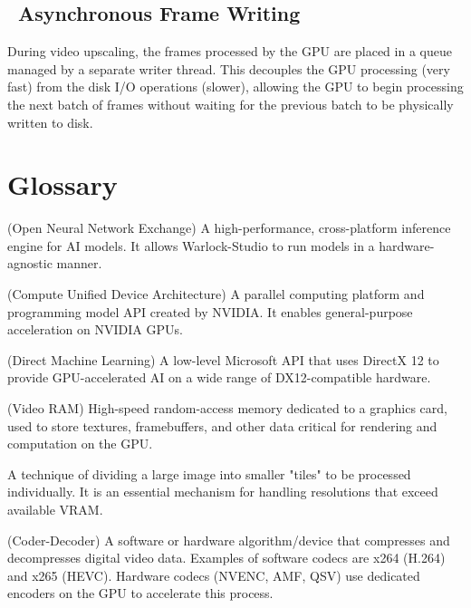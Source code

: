 \documentclass[11pt, a4paper]{article}
\newcommand{\SectionColor}{WarlockGray} %
\newcommand{\setsectioncolor}[1]{\renewcommand{\SectionColor}{#1}}
\begin{document}
\subsection{\faBolt\ Asynchronous Frame Writing}
During video upscaling, the frames processed by the GPU are placed in a queue managed by a separate writer thread. This decouples the GPU processing (very fast) from the disk I/O operations (slower), allowing the GPU to begin processing the next batch of frames without waiting for the previous batch to be physically written to disk.

\setsectioncolor{GlossaryColor}
\section{Glossary}
\begin{description}[leftmargin=*, style=nextline, itemsep=0.8em]
    \item[ONNX Runtime] (Open Neural Network Exchange) A high-performance, cross-platform inference engine for AI models. It allows Warlock-Studio to run models in a hardware-agnostic manner.
    \item[CUDA] (Compute Unified Device Architecture) A parallel computing platform and programming model API created by NVIDIA. It enables general-purpose acceleration on NVIDIA GPUs.
    \item[DirectML] (Direct Machine Learning) A low-level Microsoft API that uses DirectX 12 to provide GPU-accelerated AI on a wide range of DX12-compatible hardware.
    \item[VRAM] (Video RAM) High-speed random-access memory dedicated to a graphics card, used to store textures, framebuffers, and other data critical for rendering and computation on the GPU.
    \item[Tiling] A technique of dividing a large image into smaller "tiles" to be processed individually. It is an essential mechanism for handling resolutions that exceed available VRAM.
    \item[Codec] (Coder-Decoder) A software or hardware algorithm/device that compresses and decompresses digital video data. Examples of software codecs are x264 (H.264) and x265 (HEVC). Hardware codecs (NVENC, AMF, QSV) use dedicated encoders on the GPU to accelerate this process.
\end{description}
\end{document}
